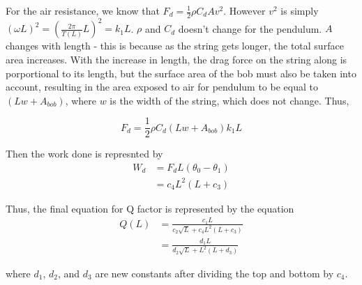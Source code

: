 \documentclass[12pt]{article}
\begin{document}
For the air resistance, we know that $F_d = \frac{1}{2}\rho C_d A v^2$. However $v^2$ is simply $(\omega L)^2 = \left(\frac{2\pi}{T(L)} L\right)^2 = k_1L$. $\rho$ and $C_d$ doesn't change for the pendulum. $A$ changes with length - this is because as the string gets longer, the total surface area increases. With the increase in length, the drag force on the string along is porportional to its length, but the surface area of the bob must also be taken into account, resulting in the area exposed to air for pendulum to be equal to $(Lw + A_{bob})$, where $w$ is the width of the string, which does not change. Thus,

\begin{equation}
    F_d = \frac{1}{2}\rho C_d (Lw + A_{bob}) k_1L
\end{equation}

Then the work done is represnted by
\begin{align*}
    W_d &= F_d L(\theta_0 - \theta_1) \\
    &= c_4L^2(L+c_3)
\end{align*}

Thus, the final equation for Q factor is represented by the equation
\begin{align}
    Q(L) &= \frac{c_1L}{c_2\sqrt{L} + c_4L^2(L+c_3)} \\
    &= \frac{d_1L}{d_2\sqrt{L} + L^2(L+d_3)}
\end{align}

where $d_1$, $d_2$, and $d_3$ are new constants after dividing the top and bottom by $c_4$.
\end{document}
